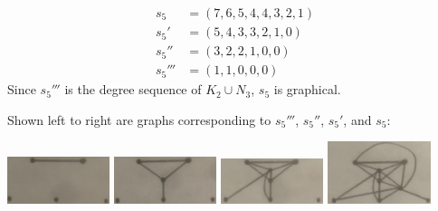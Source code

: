 \documentclass[12pt]{article}
\begin{document}
\begin{align*}
    s_5    &= (7,6,5,4,4,3,2,1) \\
    s_5'   &=   (5,4,3,3,2,1,0) \\
    s_5''  &=     (3,2,2,1,0,0) \\
    s_5''' &=       (1,1,0,0,0)
\end{align*} Since $s_5'''$ is the degree sequence of $K_2 \cup N_3$, $s_5$ is graphical.

Shown left to right are graphs corresponding to $s_5'''$, $s_5''$, $s_5'$, and $s_5$:
\begin{center}
\includegraphics[width=3cm]{IMG-0786.JPG}
\includegraphics[width=3cm]{IMG-0787.JPG}
\includegraphics[width=3cm]{IMG-0788.JPG}
\includegraphics[width=3cm]{IMG-0789.JPG}
\end{center}
\end{document}
